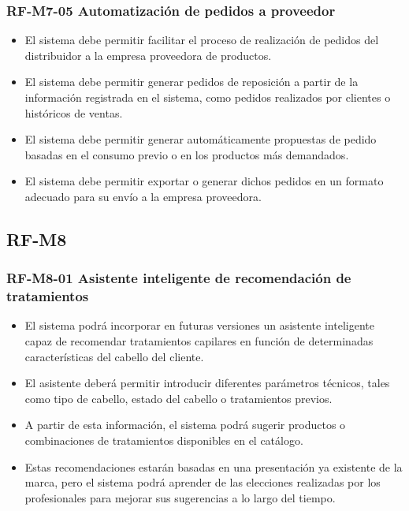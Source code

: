 \vspace{-0.75em}
\subsubsection{RF-M7-05 Automatización de pedidos a proveedor}
\vspace{-1em}

\begin{itemize}
    \item El sistema debe permitir facilitar el proceso de realización de pedidos del distribuidor a la empresa proveedora de productos.
    \item El sistema debe permitir generar pedidos de reposición a partir de la información registrada en el sistema, como pedidos realizados por clientes o históricos de ventas.
    \item El sistema debe permitir generar automáticamente propuestas de pedido basadas en el consumo previo o en los productos más demandados.
    \item El sistema debe permitir exportar o generar dichos pedidos en un formato adecuado para su envío a la empresa proveedora.
\end{itemize}

\subsection{RF-M8}

\vspace{-0.75em}
\subsubsection{RF-M8-01 Asistente inteligente de recomendación de tratamientos}
\vspace{-1em}

\begin{itemize}
    \item El sistema podrá incorporar en futuras versiones un asistente inteligente capaz de recomendar tratamientos capilares en función de determinadas características del cabello del cliente.
    \item El asistente deberá permitir introducir diferentes parámetros técnicos, tales como tipo de cabello, estado del cabello o tratamientos previos.
    \item A partir de esta información, el sistema podrá sugerir productos o combinaciones de tratamientos disponibles en el catálogo.
    \item Estas recomendaciones estarán basadas en una presentación ya existente de la marca, pero el sistema podrá aprender de las elecciones realizadas por los profesionales para mejorar sus sugerencias a lo largo del tiempo.
\end{itemize}

